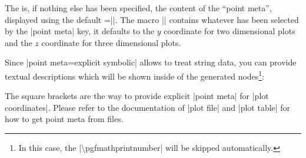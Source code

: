{\begin{pgfplotskeylist}
\begin{codeexample}[]
\end{codeexample}
	The  is, if nothing else has been specified, the content of the ``point meta'', displayed using the default =|\pgfmathprintnumber{\pgfplotspointmeta}|. The macro |\pgfplotspointmeta| contains whatever has been selected by the |point meta| key, it defaults to the $y$ coordinate for two dimensional plots and the $z$ coordinate for three dimensional plots.

	Since |point meta=explicit symbolic| allows to treat string data, you can provide textual descriptions which will be shown inside of the generated nodes\footnote{In this case, the |\textbackslash pgfmathprintnumber| will be skipped automatically.}:

\begin{codeexample}[]
\end{codeexample}
	The square brackets are the way to provide explicit |point meta| for |plot coordinates|. Please refer to the documentation of |plot file| and |plot table| for how to get point meta from files.


\end{pgfplotskeylist}}
